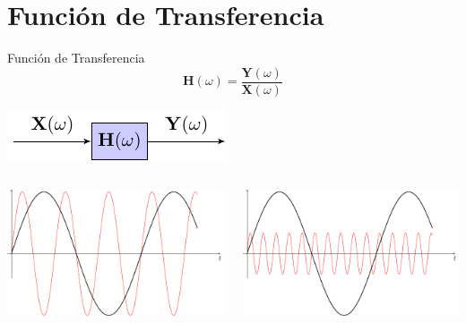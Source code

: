 \documentclass[aspectratio=169, usenames,svgnames,dvipsnames]{beamer}
\newcommand{\fasor}[1]{\mathbf{#1}(\omega)}
\begin{document}
\section{Función de Transferencia}
\label{sec:org4789d93}
\begin{frame}[label={sec:org54773c5}]{Función de Transferencia}
\[
  \fasor{H} = \frac{\fasor{Y}}{\fasor{X}}
\]
\begin{center}
\includegraphics[height=0.3\textheight]{../figs/TransferFunction.pdf}
\end{center}


\begin{columns}
\begin{column}{0.5\columnwidth}
\begin{center}
\includegraphics[height=0.3\textheight]{../figs/sinX.pdf}
\end{center}
\end{column}

\begin{column}{0.5\columnwidth}
\begin{center}
\includegraphics[height=0.3\textheight]{../figs/sinY.pdf}
\end{center}
\end{column}
\end{columns}
\end{frame}
\end{document}
